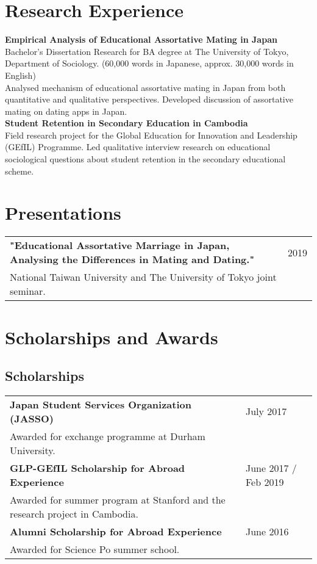 \documentclass[11pt, a4paper]{article}
\begin{document}
\section*{Research Experience}
\textbf{Empirical Analysis of Educational Assortative Mating in Japan}\\
Bachelor’s Dissertation Research for BA degree at The University of Tokyo, Department of Sociology. (60,000 words in Japanese, approx. 30,000 words in English) \\
Analysed mechanism of educational assortative mating in Japan from both quantitative and qualitative perspectives. Developed discussion of assortative mating on dating apps in Japan. \\

\noindent \textbf{Student Retention in Secondary Education in Cambodia}\\
Field research project for the Global Education for Innovation and Leadership (GEfIL) Programme. Led qualitative interview research on educational sociological questions about student retention in the secondary educational scheme. \\

\section*{Presentations}
\begin{tabular}{@{}p{}p{}}
\textbf{"Educational Assortative Marriage in Japan, Analysing the Differences in Mating and Dating."} & \hfill 2019 \\
National Taiwan University and The University of Tokyo joint seminar. \\
\end{tabular}

\section*{Scholarships and Awards}
\subsection*{Scholarships}
\begin{tabular}{@{}p{}p{}}
\textbf{Japan Student Services Organization (JASSO)} & \hfill July 2017 \\
Awarded for exchange programme at Durham University. \\
\textbf{GLP-GEfIL Scholarship for Abroad Experience} & \hfill June 2017 / Feb 2019 \\
Awarded for summer program at Stanford and the research project in Cambodia. \\
\textbf{Alumni Scholarship for Abroad Experience} & \hfill June 2016 \\
Awarded for Science Po summer school. \\
\end{tabular}
\end{document}

